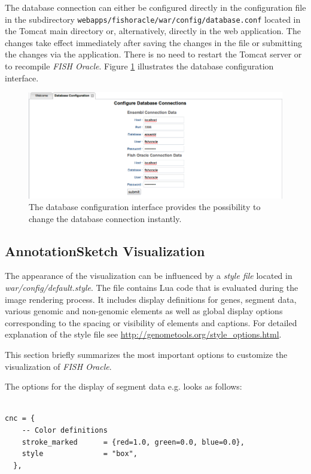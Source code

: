 \documentclass[11pt,final]{article}
\newcommand{\FO}[0]{\emph{FISH Oracle}\xspace}
\begin{document}
The database connection can either be configured directly in the configuration
file in the subdirectory \texttt{webapps/fishoracle/war/config/database.conf}
located in the Tomcat main directory or, alternatively, directly in the web
application.
The changes take effect immediately after saving the changes in the file or
submitting the changes via the application. There is no need to restart the
Tomcat server or to recompile \FO. Figure \ref{fig:dbconfig}
illustrates the database configuration interface.

\begin{figure}[h]
	\begin{center}
		\includegraphics[width=\textwidth]{fig/dbconfig.png}
	\end{center}
	\caption{The database configuration interface provides the possibility
	         to change the database connection instantly.}
	\label{fig:dbconfig}
\end{figure}

\subsection{AnnotationSketch Visualization}

The appearance of the visualization can be influenced by a \emph{style file}
located in \textit{war/config/default.style}. The file contains Lua code that
is evaluated during the image rendering process. It includes display
definitions for genes, segment data, various genomic and non-genomic elements
as well as global display options corresponding to the spacing or visibility
of elements and captions. For detailed explanation of the style file see
\url{http://genometools.org/style_options.html}.

This section briefly summarizes the most important options to customize the
visualization of \FO.

The options for the display of segment data e.g. looks as follows:
\begin{verbatim}

cnc = {
    -- Color definitions
    stroke_marked      = {red=1.0, green=0.0, blue=0.0},
    style              = "box",
  },

\end{verbatim}
\end{document}
